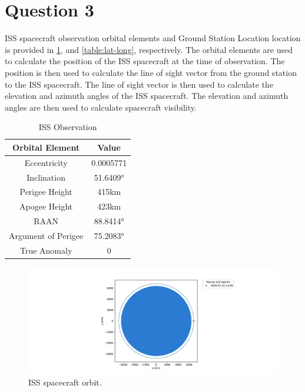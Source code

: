 \section{Question 3} 
ISS spacecraft observation orbital elements and Ground Station Location location is provided in \ref{table:orbital-elements}, and \ref{table:lat-long}, respectively. The orbital elements are used to calculate the position of the ISS spacecraft at the time of observation. The position is then used to calculate the line of sight vector from the ground station to the ISS spacecraft. The line of sight vector is then used to calculate the elevation and azimuth angles of the ISS spacecraft. The elevation and azimuth angles are then used to calculate spacecraft visibility.
\begin{table}[H]
    \centering
    \label{table:orbital-elements}
    \Tstrut
    \begin{tabular}{|c|c|}
    \hline
    Orbital Element & Value \\
    \hline
    Eccentricity & 0.0005771 \\
    Inclination & \ang{51.6409} \\
    Perigee Height & 415km \\
    Apogee Height & 423km \\
    RAAN & \ang{88.8414} \\
    Argument of Perigee & \ang{75.2083} \\
    True Anomaly & 0 \\
    \hline
    \end{tabular}
    \caption{ISS Observation}
\end{table}

\begin{figure}[H]
    \centering
    \includegraphics[width=1\textwidth]{../Figure/Q3/orbiral}
    \caption{ISS spacecraft orbit.}
    \label{fig:ISS_orbit}
\end{figure}

